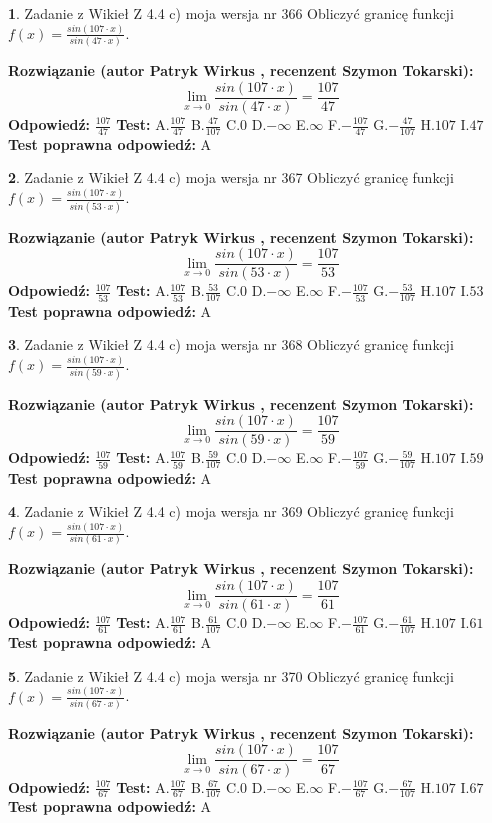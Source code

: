 \documentclass[12pt, a4paper]{article}
\theoremstyle{definition} %
\newtheorem{zad}{}
\newcommand{\zadStart}[1]{\begin{zad}#1\newline}
\newcommand{\zadStop}{\end{zad}}
\newcommand{\rozwStart}[2]{\noindent \textbf{Rozwiązanie (autor #1 , recenzent #2): }\newline}
\newcommand{\rozwStop}{\newline}
\newcommand{\odpStart}{\noindent \textbf{Odpowiedź:}\newline}
\newcommand{\odpStop}{\newline}
\newcommand{\testStart}{\noindent \textbf{Test:}\newline}
\newcommand{\testStop}{\newline}
\newcommand{\kluczStart}{\noindent \textbf{Test poprawna odpowiedź:}\newline}
\newcommand{\kluczStop}{\newline}
\begin{document}
\zadStart{Zadanie z Wikieł Z 4.4 c) moja wersja nr 366}
Obliczyć granicę funkcji $f(x)=\frac{sin(107\cdot x)}{sin(47\cdot x)}$.
\zadStop
\rozwStart{Patryk Wirkus}{Szymon Tokarski}
$$\lim\limits_{x\to 0}\frac{sin(107\cdot x)}{sin(47\cdot x)}=
\frac{107}{47}$$
\rozwStop
\odpStart
$\frac{107}{47}$
\odpStop
\testStart
A.$\frac{107}{47}$
B.$\frac{47}{107}$
C.$0$
D.$-\infty$
E.$\infty$
F.$-\frac{107}{47}$
G.$-\frac{47}{107}$
H.$107$
I.$47$
\testStop
\kluczStart
A
\kluczStop



\zadStart{Zadanie z Wikieł Z 4.4 c) moja wersja nr 367}
Obliczyć granicę funkcji $f(x)=\frac{sin(107\cdot x)}{sin(53\cdot x)}$.
\zadStop
\rozwStart{Patryk Wirkus}{Szymon Tokarski}
$$\lim\limits_{x\to 0}\frac{sin(107\cdot x)}{sin(53\cdot x)}=
\frac{107}{53}$$
\rozwStop
\odpStart
$\frac{107}{53}$
\odpStop
\testStart
A.$\frac{107}{53}$
B.$\frac{53}{107}$
C.$0$
D.$-\infty$
E.$\infty$
F.$-\frac{107}{53}$
G.$-\frac{53}{107}$
H.$107$
I.$53$
\testStop
\kluczStart
A
\kluczStop



\zadStart{Zadanie z Wikieł Z 4.4 c) moja wersja nr 368}
Obliczyć granicę funkcji $f(x)=\frac{sin(107\cdot x)}{sin(59\cdot x)}$.
\zadStop
\rozwStart{Patryk Wirkus}{Szymon Tokarski}
$$\lim\limits_{x\to 0}\frac{sin(107\cdot x)}{sin(59\cdot x)}=
\frac{107}{59}$$
\rozwStop
\odpStart
$\frac{107}{59}$
\odpStop
\testStart
A.$\frac{107}{59}$
B.$\frac{59}{107}$
C.$0$
D.$-\infty$
E.$\infty$
F.$-\frac{107}{59}$
G.$-\frac{59}{107}$
H.$107$
I.$59$
\testStop
\kluczStart
A
\kluczStop



\zadStart{Zadanie z Wikieł Z 4.4 c) moja wersja nr 369}
Obliczyć granicę funkcji $f(x)=\frac{sin(107\cdot x)}{sin(61\cdot x)}$.
\zadStop
\rozwStart{Patryk Wirkus}{Szymon Tokarski}
$$\lim\limits_{x\to 0}\frac{sin(107\cdot x)}{sin(61\cdot x)}=
\frac{107}{61}$$
\rozwStop
\odpStart
$\frac{107}{61}$
\odpStop
\testStart
A.$\frac{107}{61}$
B.$\frac{61}{107}$
C.$0$
D.$-\infty$
E.$\infty$
F.$-\frac{107}{61}$
G.$-\frac{61}{107}$
H.$107$
I.$61$
\testStop
\kluczStart
A
\kluczStop



\zadStart{Zadanie z Wikieł Z 4.4 c) moja wersja nr 370}
Obliczyć granicę funkcji $f(x)=\frac{sin(107\cdot x)}{sin(67\cdot x)}$.
\zadStop
\rozwStart{Patryk Wirkus}{Szymon Tokarski}
$$\lim\limits_{x\to 0}\frac{sin(107\cdot x)}{sin(67\cdot x)}=
\frac{107}{67}$$
\rozwStop
\odpStart
$\frac{107}{67}$
\odpStop
\testStart
A.$\frac{107}{67}$
B.$\frac{67}{107}$
C.$0$
D.$-\infty$
E.$\infty$
F.$-\frac{107}{67}$
G.$-\frac{67}{107}$
H.$107$
I.$67$
\testStop
\kluczStart
A
\kluczStop
\end{document}
